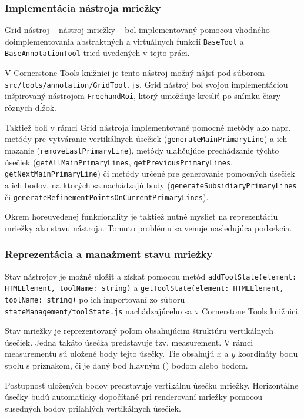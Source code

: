 \subsubsection {Implementácia nástroja mriežky}
Grid nástroj -- nástroj mriežky -- bol implementovaný pomocou vhodného doimplementovania abstraktných a virtuálnych funkcií \texttt{BaseTool} a \texttt{BaseAnnotationTool} tried uvedených v tejto práci.

V Cornerstone Tools knižnici je tento nástroj možný nájsť pod súborom \texttt{src/tools/annotation/GridTool.js}. Grid nástroj bol svojou implementáciou inšpirovaný nástrojom \texttt{FreehandRoi}, ktorý umožňuje kresliť po snímku čiary rôznych dĺžok.

Taktiež boli v rámci Grid nástroja implementované pomocné metódy ako napr. metódy pre vytváranie vertikálnych úsečiek (\texttt{generateMainPrimaryLine}) a ich mazanie (\texttt{removeLastPrimaryLine}), metódy uľahčujúce prechádzanie týchto úsečiek (\texttt{getAllMainPrimaryLines}, \texttt{getPreviousPrimaryLines}, \texttt{getNextMainPrimaryLine}) či metódy určené pre generovanie pomocných úsečiek a ich bodov, na ktorých sa nachádzajú  body (\texttt{generateSubsidiaryPrimaryLines} či \texttt{generateRefinementPointsOnCurrentPrimaryLines}).

Okrem horeuvedenej funkcionality je taktiež nutné myslieť na reprezentáciu mriežky ako stavu nástroja. Tomuto problému sa venuje nasledujúca podsekcia.

\subsubsection* {Reprezentácia a manažment stavu mriežky}
Stav nástrojov je možné uložiť a získať pomocou metód \texttt{addToolState(element: HTMLElement, toolName: string)} a \texttt{getToolState(element: HTMLElement, toolName: string)} po ich importovaní zo súboru \texttt{stateManagement/toolState.js} nachádzajúceho sa v Cornerstone Tools knižnici.

Stav mriežky je reprezentovaný poľom obsahujúcim štruktúru vertikálnych úsečiek. Jedna takáto úsečka predstavuje tzv. measurement. V rámci measurementu sú uložené body tejto úsečky. Tie obsahujú $x$ a $y$ koordináty bodu spolu s príznakom, či je daný bod hlavným () bodom alebo  bodom.

Postupnosť uložených bodov predstavuje vertikálnu úsečku mriežky. Horizontálne úsečky budú automaticky dopočítané pri renderovaní mriežky pomocou susedných bodov priľahlých vertikálnych úsečiek.

